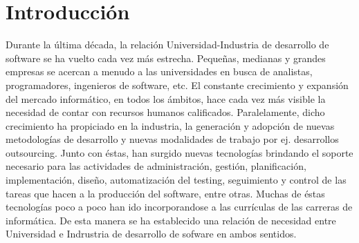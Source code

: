 \section{Introducción}

Durante la última década, la relación Universidad-Industria de desarrollo de software se ha vuelto cada vez más estrecha. Pequeñas, medianas y grandes empresas se acercan a menudo a las universidades en busca de analistas, programadores, ingenieros de software, etc.
El constante crecimiento y expansión del mercado informático, en todos los ámbitos, hace cada vez más visible la necesidad de contar con 
recursos humanos calificados. Paralelamente, dicho crecimiento ha propiciado en la industria, la generación y adopción de nuevas 
metodologías de desarrollo y nuevas modalidades de trabajo por ej. desarrollos outsourcing.
Junto con éstas, han surgido nuevas tecnologías brindando el soporte necesario para las actividades de administración, 
gestión, planificación, implementación, diseño, automatización del testing, seguimiento y control de las tareas que hacen a la producción 
del software, entre otras. Muchas de éstas tecnologías poco a poco han ido  incorporandose a las currículas de las carreras de informática. De esta manera se ha establecido una relación de necesidad entre Universidad e Indrustria de desarrollo de sofware en ambos sentidos.
 
